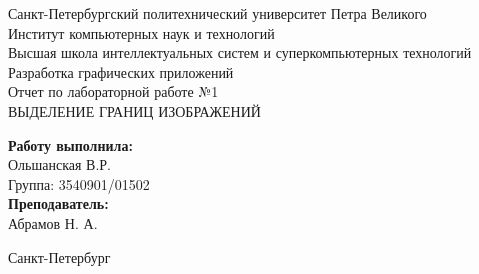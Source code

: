 \begin{titlepage}	%
	
	\begin{center}		%
		
		\large Санкт-Петербургский политехнический университет Петра Великого\\
		\large Институт компьютерных наук и технологий \\
		\large Высшая школа интеллектуальных систем и суперкомпьютерных технологий\\[6cm]
		
		\huge Разработка графических приложений\\[0.5cm] %
		\large Отчет по лабораторной работе №1\\[0.1cm]
		\large ВЫДЕЛЕНИЕ ГРАНИЦ ИЗОБРАЖЕНИЙ\\[5cm]
		
	\end{center}
	
	
	\begin{flushright} %
		\begin{minipage}{0.25\textwidth} %
			\begin{flushleft} %
				
				\large\textbf{Работу выполнила:}\\
				\large Ольшанская В.Р.\\
				\large {Группа:} 3540901/01502\\
				
				\large \textbf{Преподаватель:}\\
				\large Абрамов Н. А.
				
			\end{flushleft}
		\end{minipage}
	\end{flushright}
	
	\vfill %
	
	\begin{center}
		\large Санкт-Петербург\\
		\large \the\year %
	\end{center} %
	
\end{titlepage} %

\vfill %
